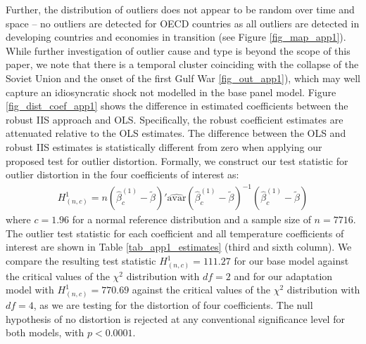 \documentclass[11pt, letterpaper]{article}
\numberwithin{algorithm}{section}
\numberwithin{assumption}{section}
\numberwithin{lemma}{section}
\numberwithin{theorem}{section}
\numberwithin{corollary}{section}
\numberwithin{remark}{section}
\numberwithin{equation}{section}
\numberwithin{figure}{section}
\numberwithin{table}{section}
\begin{document}
Further, the distribution of outliers does not appear to be random over time and space -- no outliers are detected for OECD countries as all outliers are detected in developing countries and economies in transition (see Figure \ref{fig_map_app1}). While further investigation of outlier cause and type is beyond the scope of this paper, we note that there is a temporal cluster coinciding with the collapse of the Soviet Union and the onset of the first Gulf War \ref{fig_out_app1}), which may well capture an idiosyncratic shock not modelled in the base panel model.
Figure \ref{fig_dist_coef_app1} shows the difference in estimated coefficients between the robust IIS approach and OLS. Specifically, the robust coefficient estimates are attenuated relative to the OLS estimates. The difference between the OLS and robust IIS estimates is statistically different from zero when applying our proposed test for outlier distortion. Formally, we construct our test statistic for outlier distortion in the four coefficients of interest as:
\begin{eqnarray}
H^{1}_{(n,c)} = n \left( \hat{\beta}^{( 1)}_{c} - \tilde{\beta} \right)'\widehat{\mbox{avar}}\left( \hat{\beta}^{( 1)}_{c} - \tilde{\beta} \right)^{-1}\left( \hat{\beta}^{( 1)}_{c} - \tilde{\beta} \right)
\end{eqnarray}
where $c=1.96$ for a normal reference distribution and a sample size of $n=7716$. The outlier test statistic for each coefficient and all temperature coefficients of interest are shown in Table \ref{tab_app1_estimates} (third and sixth column). We compare the resulting test statistic $H^{1}_{(n,c)} = 111.27$ for our base model against the critical values of the $\chi^{2}$ distribution with $df=2$ and for our adaptation model with $H^{1}_{(n,c)} = 770.69$ against the critical values of the $\chi^{2}$ distribution with $df=4$, as we are testing for the distortion of four coefficients. The null hypothesis of no distortion is rejected at any conventional significance level for both models, with $p<0.0001$.


\end{document}
